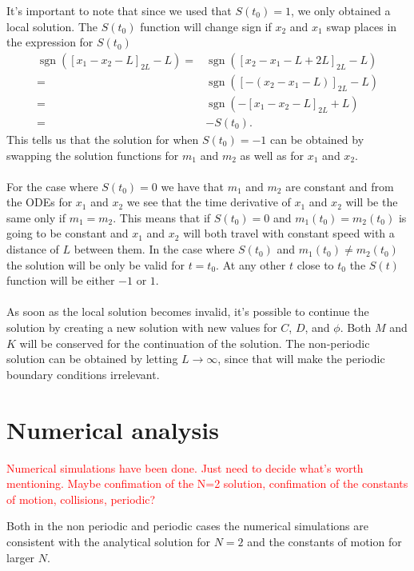 \documentclass[english,master]{liumaiex}
\theoremstyle{plain}
\theoremstyle{definition}
\newcommand\todo[1]{\textcolor{red}{#1}}
\DeclareMathOperator{\sgn}{sgn}
\begin{document}
It's important to note that since we used that $S(t_0) = 1$, we only obtained a local solution. The $S(t_0)$ function will change sign if $x_2$ and $x_1$ swap places in the expression for $S(t_0)$
\begin{equation}
\begin{aligned}
	\sgn([x_1 - x_2 - L]_{2L} - L) =& \sgn([x_2 - x_1 - L + 2L]_{2L} - L)  \\
	=& \sgn([-(x_2 - x_1 - L)]_{2L} - L) \\
	=& \sgn(-[x_1 - x_2 - L]_{2L} + L) \\
	=& -S(t_0).
\end{aligned}
\end{equation} 
This tells us that the solution for when $S(t_0) = -1$ can be obtained by swapping the solution functions for $m_1$ and $m_2$ as well as for $x_1$ and $x_2$.
\\ \\
For the case where $S(t_0) = 0$ we have that $m_1$ and $m_2$ are constant and from the ODEs for $x_1$ and $x_2$ we see that the time derivative of $x_1$ and $x_2$ will be the same only if $m_1 = m_2$. This means that if $S(t_0) = 0$ and $m_1(t_0) = m_2(t_0)$ is going to be constant and $x_1$ and $x_2$ will both travel with constant speed with a distance of $L$ between them. In the case where $S(t_0)$ and $m_1(t_0) \neq m_2(t_0)$ the solution will be only be valid for $t = t_0$. At any other $t$ close to $t_0$ the $S(t)$ function will be either $-1$ or $1$.
\\ \\
As soon as the local solution becomes invalid, it's possible to continue the solution by creating a new solution with new values for $C$, $D$, and $\phi$. Both $M$ and $K$ will be conserved for the continuation of the solution. The non-periodic solution can be obtained by letting $L \rightarrow \infty$, since that will make the periodic boundary conditions irrelevant.

\section{Numerical analysis} \label{sec:Numerical}

\todo{Numerical simulations have been done. Just need to decide what's worth mentioning. Maybe confimation of the N=2 solution, confimation of the constants of motion, collisions, periodic?}

Both in the non periodic and periodic cases the numerical simulations are consistent with the analytical solution for $N = 2$ and the constants of motion for larger $N$.
\end{document}
